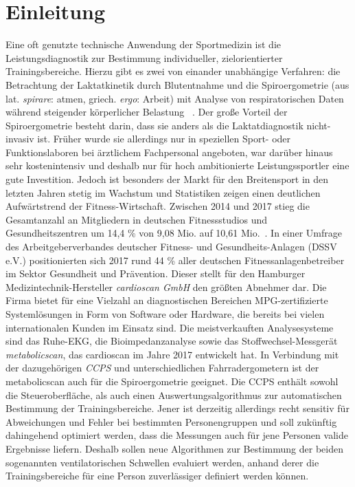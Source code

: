 \chapter{Einleitung}

Eine oft genutzte technische Anwendung der Sportmedizin ist die Leistungsdiagnostik zur Bestimmung individueller, zielorientierter Trainingsbereiche. Hierzu gibt es zwei von einander unabhängige Verfahren: die Betrachtung der Laktatkinetik durch Blutentnahme und die Spiroergometrie (aus lat. \textsl{spirare}: atmen, griech. \textsl{ergo}: Arbeit) mit Analyse von respiratorischen Daten während steigender körperlicher Belastung~\cite{Westhoff.2012} . Der große Vorteil der Spiroergometrie besteht darin, dass sie anders als die Laktatdiagnostik nicht-invasiv ist. Früher wurde sie allerdings nur in speziellen Sport- oder Funktionslaboren bei ärztlichem Fachpersonal angeboten, war darüber hinaus sehr kostenintensiv und deshalb nur für hoch ambitionierte Leistungssportler eine gute Investition. Jedoch ist besonders der Markt für den Breitensport in den letzten Jahren stetig im Wachstum und Statistiken zeigen einen deutlichen Aufwärtstrend der Fitness-Wirtschaft. Zwischen 2014 und 2017 stieg die Gesamtanzahl an Mitgliedern in deutschen Fitnessstudios und Gesundheitszentren um 14,4 \% von 9,08 Mio. auf 10,61 Mio.~\cite{DSSV.2018}. In einer Umfrage des Arbeitgeberverbandes deutscher Fitness- und Gesundheits-Anlagen (DSSV e.V.) positionierten sich 2017 rund 44 \% aller deutschen Fitnessanlagenbetreiber im Sektor Gesundheit und Prävention. Dieser stellt für den Hamburger Medizintechnik-Hersteller \textsl{cardioscan GmbH} den größten Abnehmer dar. Die Firma bietet für eine Vielzahl an diagnostischen Bereichen MPG-zertifizierte Systemlösungen in Form von Software oder Hardware, die bereits bei vielen internationalen Kunden im Einsatz sind. Die meistverkauften Analysesysteme sind das Ruhe-EKG, die Bioimpedanzanalyse sowie das Stoffwechsel-Messgerät \textsl{metabolicscan}, das cardioscan im Jahre 2017 entwickelt hat. In Verbindung mit der dazugehörigen \textsl{\ac{CCPS}} und unterschiedlichen Fahrradergometern ist der metabolicscan auch für die Spiroergometrie geeignet. Die \acs{CCPS} enthält sowohl die Steueroberfläche, als auch einen Auswertungsalgorithmus zur automatischen Bestimmung der Trainingsbereiche. Jener ist derzeitig allerdings recht sensitiv für Abweichungen und Fehler bei bestimmten Personengruppen und soll zukünftig dahingehend optimiert werden, dass die Messungen auch für jene Personen valide Ergebnisse liefern. Deshalb sollen neue Algorithmen zur Bestimmung der beiden sogenannten ventilatorischen Schwellen evaluiert werden, anhand derer die Trainingsbereiche für eine Person zuverlässiger definiert werden können.

